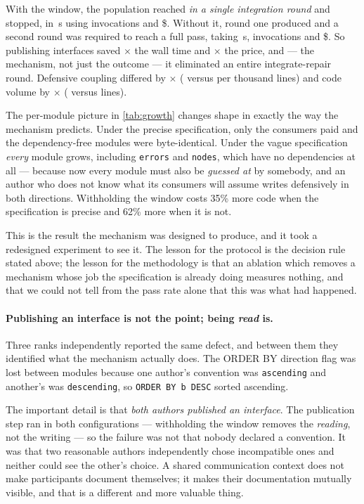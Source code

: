 \documentclass[10pt,twocolumn]{article}
\theoremstyle{definition}
\theoremstyle{plain}
\newcommand{\code}[1]{\texttt{\small #1}}
\begin{document}
With the window, the population reached \NVagueSharedRoundOne{} \emph{in a single
integration round} and stopped, in \NVagueSharedWall\,s using \NVagueSharedCalls{}
invocations and \$\NVagueSharedUsd. Without it, round one produced
\NVagueNosRoundOne{} and a second round was required to reach a full pass, taking
\NVagueNosWall\,s, \NVagueNosCalls{} invocations and \$\NVagueNosUsd. So publishing
interfaces saved \NVagueWallRatio$\times$ the wall time and \NVaguePriceRatio$\times$
the price, and --- the mechanism, not just the outcome --- it eliminated an entire
integrate-repair round. Defensive coupling differed by \NVagueDefRatio$\times$
(\NVagueSharedDef{} versus \NVagueNosDef{} per thousand lines) and code volume by
\NVagueLinesRatio$\times$ (\NVagueSharedLines{} versus \NVagueNosLines{} lines).

The per-module picture in \cref{tab:growth} changes shape in exactly the way the
mechanism predicts. Under the precise specification, only the consumers paid and the
dependency-free modules were byte-identical. Under the vague specification \emph{every}
module grows, including \code{errors} and \code{nodes}, which have no dependencies at
all --- because now every module must also be \emph{guessed at} by somebody, and an
author who does not know what its consumers will assume writes defensively in both
directions. Withholding the window costs 35\% more code when the specification is
precise and 62\% more when it is not.

This is the result the mechanism was designed to produce, and it took a redesigned
experiment to see it. The lesson for the protocol is the decision rule stated above;
the lesson for the methodology is that an ablation which removes a mechanism whose job
the specification is already doing measures nothing, and that we could not tell from
the pass rate alone that this was what had happened.

\paragraph{Publishing an interface is not the point; being \emph{read} is.} Three ranks
independently reported the same defect, and between them they identified what the
mechanism actually does. The ORDER BY direction flag was lost between modules because one
author's convention was \code{ascending} and another's was \code{descending}, so
\code{ORDER BY b DESC} sorted ascending.

The important detail is that \emph{both authors published an interface}. The publication
step ran in both configurations --- withholding the window removes the \emph{reading}, not
the writing --- so the failure was not that nobody declared a convention. It was that two
reasonable authors independently chose incompatible ones and neither could see the other's
choice. A shared communication context does not make participants document themselves; it
makes their documentation mutually visible, and that is a different and more valuable
thing.
\end{document}
